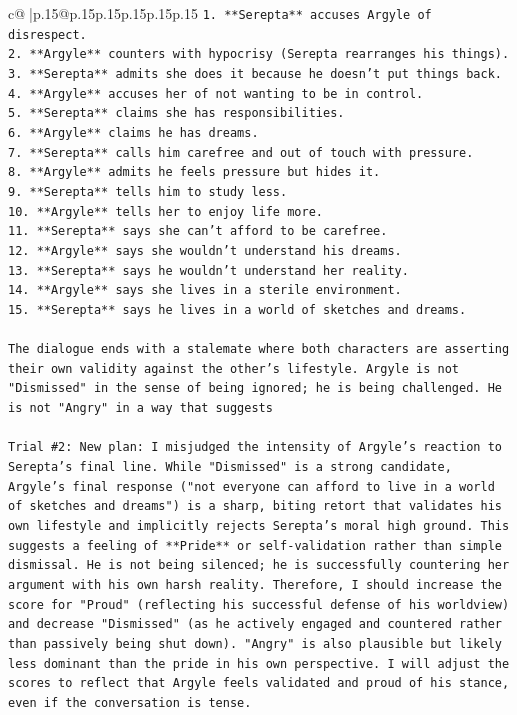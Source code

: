 \documentclass{article}
\begin{document}
{\begin{supertabular}{c@{$\;$}|p{.15\linewidth}@{}p{.15\linewidth}p{.15\linewidth}p{.15\linewidth}p{.15\linewidth}p{.15\linewidth}}
{{{\texttt{1.  **Serepta** accuses Argyle of disrespect.} \\
\texttt{2.  **Argyle** counters with hypocrisy (Serepta rearranges his things).} \\
\texttt{3.  **Serepta** admits she does it because he doesn't put things back.} \\
\texttt{4.  **Argyle** accuses her of not wanting to be in control.} \\
\texttt{5.  **Serepta** claims she has responsibilities.} \\
\texttt{6.  **Argyle** claims he has dreams.} \\
\texttt{7.  **Serepta** calls him carefree and out of touch with pressure.} \\
\texttt{8.  **Argyle** admits he feels pressure but hides it.} \\
\texttt{9.  **Serepta** tells him to study less.} \\
\texttt{10. **Argyle** tells her to enjoy life more.} \\
\texttt{11. **Serepta** says she can't afford to be carefree.} \\
\texttt{12. **Argyle** says she wouldn't understand his dreams.} \\
\texttt{13. **Serepta** says he wouldn't understand her reality.} \\
\texttt{14. **Argyle** says she lives in a sterile environment.} \\
\texttt{15. **Serepta** says he lives in a world of sketches and dreams.} \\
\\ 
\texttt{The dialogue ends with a stalemate where both characters are asserting their own validity against the other's lifestyle. Argyle is not "Dismissed" in the sense of being ignored; he is being challenged. He is not "Angry" in a way that suggests} \\
\\ 
\texttt{Trial \#2: New plan: I misjudged the intensity of Argyle's reaction to Serepta's final line. While "Dismissed" is a strong candidate, Argyle's final response ("not everyone can afford to live in a world of sketches and dreams") is a sharp, biting retort that validates his own lifestyle and implicitly rejects Serepta's moral high ground. This suggests a feeling of **Pride** or self{-}validation rather than simple dismissal. He is not being silenced; he is successfully countering her argument with his own harsh reality. Therefore, I should increase the score for "Proud" (reflecting his successful defense of his worldview) and decrease "Dismissed" (as he actively engaged and countered rather than passively being shut down). "Angry" is also plausible but likely less dominant than the pride in his own perspective. I will adjust the scores to reflect that Argyle feels validated and proud of his stance, even if the conversation is tense.} \\
}}}
\end{supertabular}}
\end{document}
